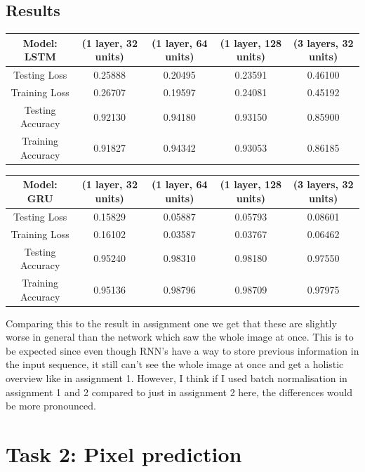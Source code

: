 \documentclass{article}
\begin{document}
\subsection{Results}

\begin{center}
  \begin{tabular}{ |c|c|c|c|c| } 
    \hline
    Model: LSTM & (1 layer, 32 units) & (1 layer, 64 units) & (1 layer, 128 units) & (3 layers, 32 units) \\
    \hline
    Testing Loss & 0.25888 & 0.20495 & 0.23591 & 0.46100 \\
    Training Loss & 0.26707 & 0.19597 & 0.24081 & 0.45192 \\
    \hline
    Testing Accuracy & 0.92130 & 0.94180 & 0.93150 & 0.85900 \\
    Training Accuracy & 0.91827 & 0.94342 & 0.93053 & 0.86185 \\
    \hline
  \end{tabular}
\end{center}

\begin{center}
  \begin{tabular}{ |c|c|c|c|c| } 
    \hline
    Model: GRU & (1 layer, 32 units) & (1 layer, 64 units) & (1 layer, 128 units) & (3 layers, 32 units) \\
    \hline
    Testing Loss & 0.15829 & 0.05887 & 0.05793 & 0.08601 \\
    Training Loss & 0.16102 & 0.03587 & 0.03767 & 0.06462 \\
    \hline
    Testing Accuracy & 0.95240 & 0.98310 & 0.98180 & 0.97550 \\
    Training Accuracy & 0.95136 & 0.98796 & 0.98709 & 0.97975 \\
    \hline
  \end{tabular}
\end{center}

Comparing this to the result in assignment one we get that these are slightly
worse in general than the network which saw the whole image at once. This is to
be expected since even though RNN's have a way to store previous information in
the input sequence, it still can't see the whole image at once and get a
holistic overview like in assignment 1. However, I think if I used batch
normalisation in assignment 1 and 2 compared to just in assignment 2 here, the
differences would be more pronounced.

\section{Task 2: Pixel prediction}
\end{document}
